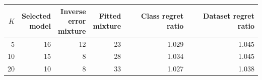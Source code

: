 \begin{tabular}{rrrrrr}
\toprule
$K$ & \shortstack[r]{Selected\\model} & \shortstack[r]{Inverse\\error\\mixture} & \shortstack[r]{Fitted\\mixture} & Class regret ratio & Dataset regret ratio \\
\midrule
5 & 16 & 12 & 23 & 1.029 & 1.045 \\
10 & 15 & 8 & 28 & 1.034 & 1.045 \\
20 & 10 & 8 & 33 & 1.027 & 1.038 \\
\bottomrule
\end{tabular}
